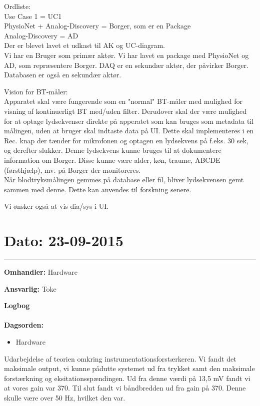 Ordliste:\\ 
Use Case 1 = UC1 \\
PhysioNet + Analog-Discovery = Borger, som er en Package \\
Analog-Discovery = AD \\

Der er blevet lavet et udkast til AK og UC-diagram. \\
Vi har en Bruger som primær aktør. Vi har lavet en package med PhysioNet og AD, som repræsentere Borger. DAQ er en sekundær aktør, der påvirker Borger. Databasen er også en sekundær aktør. 

Vision for BT-måler:\\
Apparatet skal være fungerende som en "normal" BT-måler med mulighed for visning af kontinuerligt BT med/uden filter. Derudover skal der være mulighed for at optage lydsekvenser direkte på apperatet som kan bruges som metadata til målingen, uden at bruger skal indtaste data på UI. Dette skal implementeres i en Rec. knap der tænder for mikrofonen og optagen en lydsekvens på f.eks. 30 sek, og derefter slukker. Denne lydsekvens kunne bruges til at dokumentere information om Borger. Disse kunne være alder, køn, traume, ABCDE (førsthjælp), mv. på Borger der monitoreres. \\
Når blodtryksmålingen gemmes på database eller fil, bliver lydsekvensen gemt sammen med denne. Dette kan anvendes til forskning senere. 

Vi ønsker også at vis dia/sys i UI. 




\section{Dato: 23-09-2015 }
\hrule

\textbf{Omhandler:} Hardware

\textbf{Ansvarlig:} Toke

\textbf{Logbog}
\\
\\
\textbf{Dagsorden:}
\begin{itemize}
	\item Hardware
\end{itemize}

Udarbejdelse af teorien omkring instrumentationsforstærkeren. Vi fandt det maksimale output, vi kunne pådutte systemet ud fra trykket samt den maksimale forstærkning og eksitationsspændingen. Ud fra denne værdi på 13,5 mV fandt vi at vores gain var 370. Til slut fandt vi båndbredden ud fra gain på 370. Denne skulle være over 50 Hz, hvilket den var. 
	



